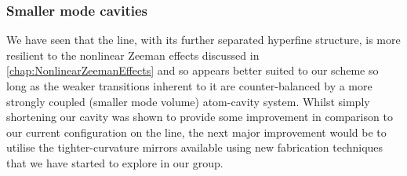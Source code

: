 \documentclass[../Thesis-IJspeert.tex]{subfiles}
\begin{document}
%
%
%

\subsubsection*{Smaller mode cavities}

We have seen that the \DOne{} line, with its further separated hyperfine structure, is more resilient to the nonlinear Zeeman effects discussed in \cref{chap:NonlinearZeemanEffects} and so appears better suited to our scheme so long as the weaker transitions inherent to it are counter-balanced by a more strongly coupled (smaller mode volume) atom-cavity system.  Whilst simply shortening our cavity was shown to provide some improvement in comparison to our current configuration on the \DTwo{} line, the next major improvement would be to utilise the tighter-curvature mirrors available using new fabrication techniques that we have started to explore in our group.
\end{document}
